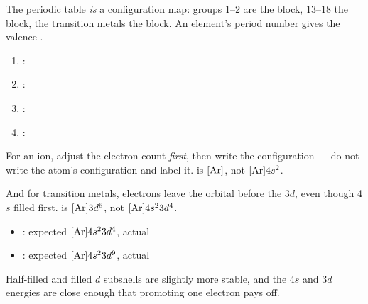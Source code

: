 \documentclass{apchem-notes}
\begin{document}

The periodic table \emph{is} a configuration map: groups 1--2 are the
 block, 13--18 the  block,
the transition metals the  block. An element's
period number gives the valence .


\begin{enumerate}[leftmargin=*,itemsep=0.3em]
  \item {}: 
  \item {}: 
  \item {}: 
  \item {}: 
\end{enumerate}



\begin{apctrap}
For an ion, adjust the electron count \emph{first}, then write the
configuration --- do not write the atom's configuration and label it.
 is $[\ce{Ar}]$, not $[\ce{Ar}]4s^2$.

And for transition metals, electrons leave the 
orbital before the 3$d$, even though 4$s$ filled first.  is
$[\ce{Ar}]3d^6$, not $[\ce{Ar}]4s^2 3d^4$.
\end{apctrap}


\begin{itemize}[leftmargin=*,itemsep=0.2em]
  \item {}: expected $[\ce{Ar}]4s^2 3d^4$, actual
  \item {}: expected $[\ce{Ar}]4s^2 3d^9$, actual
\end{itemize}

Half-filled and filled $d$ subshells are slightly more stable, and the 4$s$
and 3$d$ energies are close enough that promoting one electron pays off.

\end{document}
